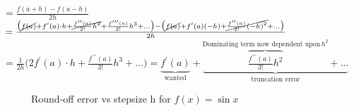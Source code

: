 \documentclass[a4paper,12pt]{report}
\begin{document}
\begin{center}
	\Large$= \frac{f(a+h) - f(a-h)}{2h}$\\
	\bigskip
	$= \frac{\big( \cancel{f(a)} + f^\prime(a)\cdot h  + \cancel{\frac{f^{\prime \prime}(a)    }{2!}h^2} + \frac{f^{\prime \prime \prime}(a)}{3!}h^3 + ... \big) - \big( \cancel{f(a)} +   f^\prime(a)(-h) +  \cancel{\frac{f^{\prime \prime}(a)}{2!}(-h)^2} +... \big)     }{2h}$\\
	\bigskip
	\large $= \frac{1}{2h} \big(2f^\prime(a) \cdot h + \frac{f^{\prime \prime \prime}(a)}{3!} h^3 + ... \big) = \underbrace{f^\prime(a)}_{\text{wanted}} + \underbrace{\!\!\!\!\!\!\!\!\!\!\!\!\!\!\!\!\!\!\!\!\!\!\!\!\!\!\! \overbrace{\frac{f^{\prime \prime \prime}(a)}{3!}h^2}^{{\text{Dominating term now dependent upon}\, h^2}} \!\!\!\!\!\!\!\!\!\!\!\!\!\!\!\!\!\!\!\!\!\!\!\!\!\!\!           +...}_{\text{truncation error}}$
\end{center}
	

\begin{figure}[!htb]

	\caption{Round-off error vs stepsize h for $f(x) = \sin x$ }\label{fig:Excel Difference}
\end{figure}
\FloatBarrier


\end{document}

